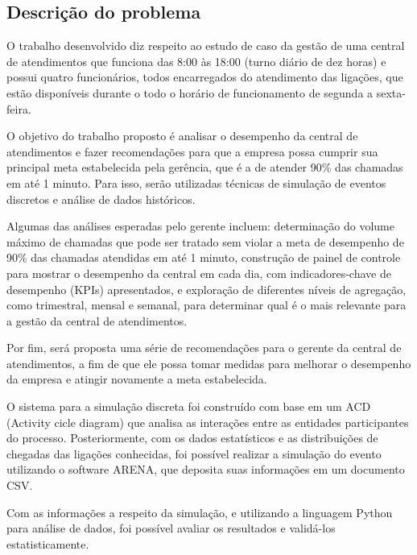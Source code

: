 \subsection{Descrição do problema}
\label{section: descricao}
O trabalho desenvolvido diz respeito ao estudo de caso da gestão de uma central de atendimentos que funciona das 8:00 às 18:00 (turno diário de dez horas) e possui quatro funcionários, todos encarregados do atendimento das ligações, que estão disponíveis durante o todo o horário de funcionamento de segunda a sexta-feira.

O objetivo do trabalho proposto é analisar o desempenho da central de atendimentos e fazer recomendações para que a empresa possa cumprir sua principal meta estabelecida pela gerência, que é a de atender 90\% das chamadas em até 1 minuto. Para isso, serão utilizadas técnicas de simulação de eventos discretos e análise de dados históricos.

Algumas das análises esperadas pelo gerente incluem: determinação do volume máximo de chamadas que pode ser tratado sem violar a meta de desempenho de 90\% das chamadas atendidas em até 1 minuto, construção de painel de controle para mostrar o desempenho da central em cada dia, com indicadores-chave de desempenho (KPIs) apresentados, e exploração de diferentes níveis de agregação, como trimestral, mensal e semanal, para determinar qual é o mais relevante para a gestão da central de atendimentos.

Por fim, será proposta uma série de recomendações para o gerente da central de atendimentos, a fim de que ele possa tomar medidas para melhorar o desempenho da empresa e atingir novamente a meta estabelecida.

O sistema para a simulação discreta foi construído com base em um ACD (Activity cicle diagram) que analisa as interações entre as entidades participantes do processo. Posteriormente, com os dados estatísticos e as distribuições de chegadas das ligações conhecidas, foi possível realizar a simulação do evento utilizando o software ARENA, que deposita suas informações em um documento CSV. 

Com as informações a respeito da simulação, e utilizando a linguagem Python para análise de dados, foi possível avaliar os resultados e validá-los estatisticamente.
